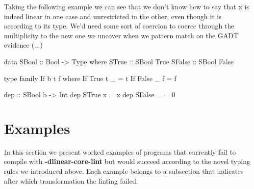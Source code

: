\documentclass[]{lwnovathesis}
\begin{document}

Taking the following example we can see that we don't know how to say
that x is indeed linear in one case and unrestricted in the other, even though
it is according to its type. We'd need some sort of coercion to coerce through
the multiplicity to the new one we uncover when we pattern match on the GADT
evidence (...)

\begin{code}
data SBool :: Bool -> Type where
  STrue :: SBool True
  SFalse :: SBool False

type family If b t f where
  If True t _ = t
  If False _ f = f

dep :: SBool b -> Int %
dep STrue x = x
dep SFalse _ = 0
\end{code}








\section{Examples\label{examples}}

In this section we present worked examples of programs that currently fail to
compile with \textbf{-dlinear-core-lint} but would succeed according to the
novel typing rules we introduced above. Each example belongs to a subsection
that indicates after which transformation the linting failed.
\end{document}
